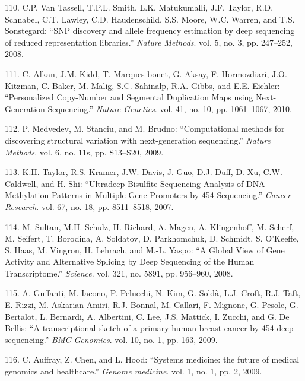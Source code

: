\documentclass[12pt,twoside]{reedthesis}
\theoremstyle{definition}
\theoremstyle{definition}
\theoremstyle{remark}
\begin{document}
  \hypertarget{ref-VanTassell2008}{}
  110. C.P. Van Tassell, T.P.L. Smith, L.K. Matukumalli, J.F. Taylor, R.D.
  Schnabel, C.T. Lawley, C.D. Haudenschild, S.S. Moore, W.C. Warren, and
  T.S. Sonstegard: ``SNP discovery and allele frequency estimation by deep
  sequencing of reduced representation libraries.'' \emph{Nature Methods}.
  vol. 5, no. 3, pp. 247--252, 2008.
  
  \hypertarget{ref-Alkan2010}{}
  111. C. Alkan, J.M. Kidd, T. Marques-bonet, G. Aksay, F. Hormozdiari,
  J.O. Kitzman, C. Baker, M. Malig, S.C. Sahinalp, R.A. Gibbs, and E.E.
  Eichler: ``Personalized Copy-Number and Segmental Duplication Maps using
  Next-Generation Sequencing.'' \emph{Nature Genetics}. vol. 41, no. 10,
  pp. 1061--1067, 2010.
  
  \hypertarget{ref-Medvedev2009}{}
  112. P. Medvedev, M. Stanciu, and M. Brudno: ``Computational methods for
  discovering structural variation with next-generation sequencing.''
  \emph{Nature Methods}. vol. 6, no. 11s, pp. S13--S20, 2009.
  
  \hypertarget{ref-Taylor2007}{}
  113. K.H. Taylor, R.S. Kramer, J.W. Davis, J. Guo, D.J. Duff, D. Xu,
  C.W. Caldwell, and H. Shi: ``Ultradeep Bisulfite Sequencing Analysis of
  DNA Methylation Patterns in Multiple Gene Promoters by 454 Sequencing.''
  \emph{Cancer Research}. vol. 67, no. 18, pp. 8511--8518, 2007.
  
  \hypertarget{ref-Sultan2008}{}
  114. M. Sultan, M.H. Schulz, H. Richard, A. Magen, A. Klingenhoff, M.
  Scherf, M. Seifert, T. Borodina, A. Soldatov, D. Parkhomchuk, D.
  Schmidt, S. O'Keeffe, S. Haas, M. Vingron, H. Lehrach, and M.-L. Yaspo:
  ``A Global View of Gene Activity and Alternative Splicing by Deep
  Sequencing of the Human Transcriptome.'' \emph{Science}. vol. 321, no.
  5891, pp. 956--960, 2008.
  
  \hypertarget{ref-Guffanti2009}{}
  115. A. Guffanti, M. Iacono, P. Pelucchi, N. Kim, G. Soldà, L.J. Croft,
  R.J. Taft, E. Rizzi, M. Askarian-Amiri, R.J. Bonnal, M. Callari, F.
  Mignone, G. Pesole, G. Bertalot, L. Bernardi, A. Albertini, C. Lee, J.S.
  Mattick, I. Zucchi, and G. De Bellis: ``A transcriptional sketch of a
  primary human breast cancer by 454 deep sequencing.'' \emph{BMC
  Genomics}. vol. 10, no. 1, pp. 163, 2009.
  
  \hypertarget{ref-Auffray2009}{}
  116. C. Auffray, Z. Chen, and L. Hood: ``Systems medicine: the future of
  medical genomics and healthcare.'' \emph{Genome medicine}. vol. 1, no.
  1, pp. 2, 2009.
  
\end{document}
